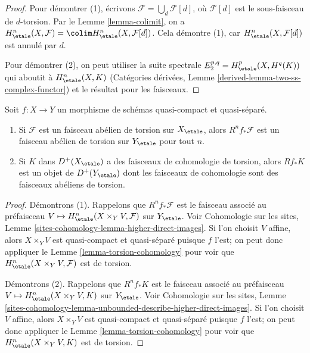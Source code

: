 \begin{proof}
Pour démontrer (1), écrivons $\mathcal{F} = \bigcup_d \mathcal{F}[d]$, où
$\mathcal{F}[d]$ est le sous-faisceau de $d$-torsion. Par le
Lemme \ref{lemma-colimit}, on a
$H^n_\etale(X, \mathcal{F}) = \colim H^n_\etale(X, \mathcal{F}[d])$.
Cela démontre (1), car $H^n_\etale(X, \mathcal{F}[d])$ est annulé par $d$.

\medskip\noindent
Pour démontrer (2), on peut utiliser la suite spectrale
$E_2^{p, q} = H^p_\etale(X, H^q(K))$ qui aboutit à $H^n_\etale(X, K)$
(Catégories dérivées, Lemme \ref{derived-lemma-two-ss-complex-functor})
et le résultat pour les faisceaux.
\end{proof}

\begin{lemma}
\label{lemma-torsion-direct-image}
Soit $f : X \to Y$ un morphisme de schémas quasi-compact et
quasi-séparé.
\begin{enumerate}
\item Si $\mathcal{F}$ est un faisceau abélien de torsion sur $X_\etale$, alors
$R^nf_*\mathcal{F}$ est un faisceau abélien de torsion sur $Y_\etale$ pour tout $n$.
\item Si $K$ dans $D^+(X_\etale)$ a des faisceaux de cohomologie de torsion, alors
$Rf_*K$ est un objet de $D^+(Y_\etale)$ dont les faisceaux de cohomologie sont
des faisceaux abéliens de torsion.
\end{enumerate}
\end{lemma}

\begin{proof}
Démontrons (1). Rappelons que $R^nf_*\mathcal{F}$ est le faisceau associé
au préfaisceau $V \mapsto H^n_\etale(X \times_Y V, \mathcal{F})$
sur $Y_\etale$. Voir Cohomologie sur les sites,
Lemme \ref{sites-cohomology-lemma-higher-direct-images}.
Si l'on choisit $V$ affine, alors $X \times_Y V$ est
quasi-compact et quasi-séparé puisque $f$ l'est; on peut donc
appliquer le Lemme \ref{lemma-torsion-cohomology} pour voir que
$H^n_\etale(X \times_Y V, \mathcal{F})$ est de torsion.

\medskip\noindent
Démontrons (2). Rappelons que $R^nf_*K$ est le faisceau associé
au préfaisceau $V \mapsto H^n_\etale(X \times_Y V, K)$
sur $Y_\etale$. Voir Cohomologie sur les sites,
Lemme \ref{sites-cohomology-lemma-unbounded-describe-higher-direct-images}.
Si l'on choisit $V$ affine, alors $X \times_Y V$ est
quasi-compact et quasi-séparé puisque $f$ l'est; on peut donc
appliquer le Lemme \ref{lemma-torsion-cohomology} pour voir que
$H^n_\etale(X \times_Y V, K)$ est de torsion.
\end{proof}









